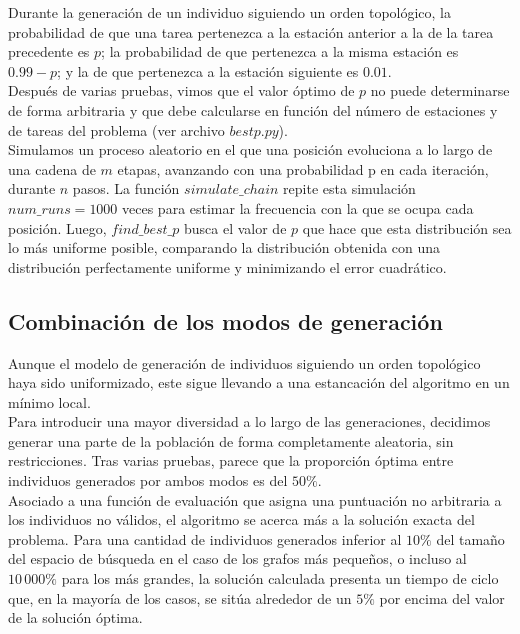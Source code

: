 \documentclass[12pt]{report}
\begin{document}
Durante la generación de un individuo siguiendo un orden topológico, la probabilidad de que una tarea pertenezca a la estación anterior a la de la tarea precedente es $p$; la probabilidad de que pertenezca a la misma estación es $0.99 - p$; y la de que pertenezca a la estación siguiente es $0.01$.\\ 

Después de varias pruebas, vimos que el valor óptimo de $p$ no puede determinarse de forma arbitraria y que debe calcularse en función del número de estaciones y de tareas del problema (ver archivo $bestp.py$).\\
Simulamos un proceso aleatorio en el que una posición evoluciona a lo largo de una cadena de $m$ etapas, avanzando con una probabilidad p en cada iteración, durante $n$ pasos. La función $simulate\_chain$ repite esta simulación $num\_runs = 1000$ veces para estimar la frecuencia con la que se ocupa cada posición. Luego, $find\_best\_p$ busca el valor de $p$ que hace que esta distribución sea lo más uniforme posible, comparando la distribución obtenida con una distribución perfectamente uniforme y minimizando el error cuadrático.

\subsection*{Combinación de los modos de generación}

Aunque el modelo de generación de individuos siguiendo un orden topológico haya sido uniformizado, este sigue llevando a una estancación del algoritmo en un mínimo local.\\

Para introducir una mayor diversidad a lo largo de las generaciones, decidimos generar una parte de la población de forma completamente aleatoria, sin restricciones. Tras varias pruebas, parece que la proporción óptima entre individuos generados por ambos modos es del $50\%$.\\

Asociado a una función de evaluación que asigna una puntuación no arbitraria a los individuos no válidos, el algoritmo se acerca más a la solución exacta del problema. Para una cantidad de individuos generados inferior al $10\%$ del tamaño del espacio de búsqueda en el caso de los grafos más pequeños, o incluso al $10\,000\%$ para los más grandes, la solución calculada presenta un tiempo de ciclo que, en la mayoría de los casos, se sitúa alrededor de un $5\%$ por encima del valor de la solución óptima.\\
\end{document}
